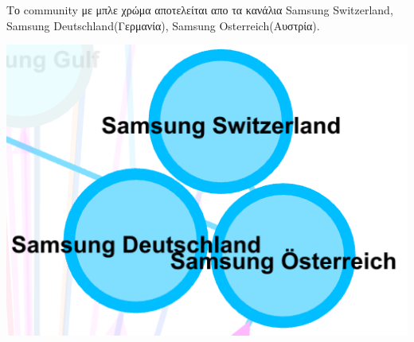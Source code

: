 \documentclass[12pt]{article}
\begin{document}
	\vspace{12pt}
	\vspace{12pt}
	\vspace{12pt}
	\begin{minipage}{0.6\textwidth}
		Το community με μπλε χρώμα αποτελείται απο τα κανάλια Samsung Switzerland, Samsung Deutschland(Γερμανία), Samsung Osterreich(Αυστρία).
	\end{minipage}
	\hspace{0.05\textwidth}
	\begin{minipage}{0.3\textwidth}
		\includegraphics[width=1.0\textwidth]{photos-files/section12/0.1/swi_ost_deu_community.png}
	\end{minipage}
	
\end{document}
